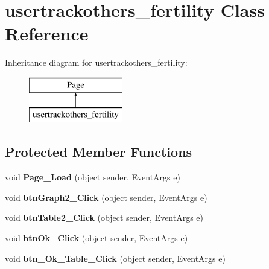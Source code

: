 \hypertarget{classusertrackothers__fertility}{\section{usertrackothers\-\_\-fertility Class Reference}
\label{classusertrackothers__fertility}
}
Inheritance diagram for usertrackothers\-\_\-fertility\-:\begin{figure}[H]
\begin{center}
\leavevmode
\includegraphics[height=2.000000cm]{classusertrackothers__fertility}
\end{center}
\end{figure}
\subsection*{Protected Member Functions}
\begin{DoxyCompactItemize}
\item 
\hypertarget{classusertrackothers__fertility_a66a21965e8f3bb1936b3ba078bb4ec59}{void {\bfseries Page\-\_\-\-Load} (object sender, Event\-Args e)}\label{classusertrackothers__fertility_a66a21965e8f3bb1936b3ba078bb4ec59}

\item 
\hypertarget{classusertrackothers__fertility_a35649da76ac51a06cd314142f0b91998}{void {\bfseries btn\-Graph2\-\_\-\-Click} (object sender, Event\-Args e)}\label{classusertrackothers__fertility_a35649da76ac51a06cd314142f0b91998}

\item 
\hypertarget{classusertrackothers__fertility_a896ad834e912acf093a78a86601c49d4}{void {\bfseries btn\-Table2\-\_\-\-Click} (object sender, Event\-Args e)}\label{classusertrackothers__fertility_a896ad834e912acf093a78a86601c49d4}

\item 
\hypertarget{classusertrackothers__fertility_ab4fb54b695d438a429bc5794c55060ca}{void {\bfseries btn\-Ok\-\_\-\-Click} (object sender, Event\-Args e)}\label{classusertrackothers__fertility_ab4fb54b695d438a429bc5794c55060ca}

\item 
\hypertarget{classusertrackothers__fertility_ab21a58bf4b951434334aa7275b436070}{void {\bfseries btn\-\_\-\-Ok\-\_\-\-Table\-\_\-\-Click} (object sender, Event\-Args e)}\label{classusertrackothers__fertility_ab21a58bf4b951434334aa7275b436070}

\end{DoxyCompactItemize}


